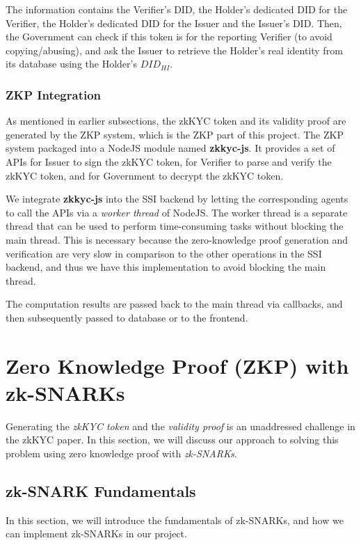 \documentclass[
]{report}
\begin{document}
The information contains the Verifier's DID, the Holder's dedicated DID for
the Verifier, the Holder's dedicated DID for the Issuer and the Issuer's
DID. Then, the Government can check if this token is for the reporting
Verifier (to avoid copying/abusing), and ask the Issuer to retrieve the
Holder's real identity from its database using the Holder's $DID_{HI}$.

\subsection{ZKP Integration}
As mentioned in earlier subsections, the zkKYC token and its validity proof
are generated by the ZKP system, which is the ZKP part of this project.
The ZKP system packaged into a NodeJS module named \textbf{zkkyc-js}. It
provides a set of APIs for Issuer to sign the zkKYC token, for Verifier
to parse and verify the zkKYC token, and for Government to decrypt the
zkKYC token.

We integrate \textbf{zkkyc-js} into the SSI backend by letting the
corresponding agents to call the APIs via a \emph{worker thread} of NodeJS.
The worker thread is a separate thread that can be used to perform
time-consuming tasks without blocking the main thread. This is necessary
because the zero-knowledge proof generation and verification are very
slow in comparison to the other operations in the SSI backend, and thus
we have this implementation to avoid blocking the main thread.

The computation results are passed back to the main thread via callbacks,
and then subsequently passed to database or to the frontend.

\chapter{Zero Knowledge Proof (ZKP) with zk-SNARKs}

Generating the \emph{zkKYC token} and the \emph{validity proof} is an
unaddressed challenge in the zkKYC paper. In this section, we will
discuss our approach to solving this problem using zero knowledge proof
with \emph{zk-SNARKs}.

\section{zk-SNARK Fundamentals}

In this section, we will introduce the fundamentals of zk-SNARKs, and
how we can implement zk-SNARKs in our project.
\end{document}
